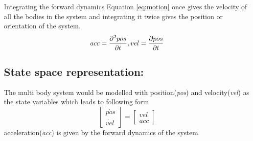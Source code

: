 Integrating the forward dynamics Equation \ref{eq:motion} once gives the velocity of all the bodies in the system and integrating it twice gives the position or orientation of the system. $$ acc = \frac{\partial {^2pos}}{\partial {t}}, vel = \frac{\partial {pos}}{\partial {t}} $$ 
\subsection{State space representation:}
The multi body system would be modelled with position(\emph{pos}) and velocity(\emph{vel}) as the state variables which leads to following form 
\begin{equation}
\label{eq:newton_motion}
 \begin{bmatrix}
\dot{pos} \\ \dot{vel}
\end{bmatrix}
= \begin{bmatrix}
vel \\ acc
\end{bmatrix}
\end{equation}
acceleration(\emph{acc}) is given by the forward dynamics of the system.

